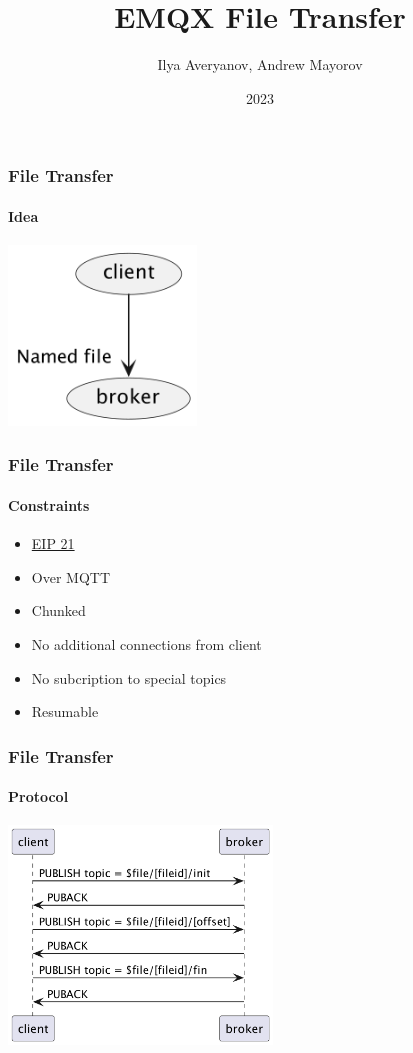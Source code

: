 \documentclass{beamer}
\title{EMQX File Transfer}
\author{Ilya Averyanov, Andrew Mayorov}
\institute{EMQX}
\date{2023}
\begin{document}
\frame{\titlepage}

\begin{frame}
    \frametitle{File Transfer}
    \framesubtitle{Idea}

    \begin{center}
        \includegraphics[width=5cm, keepaspectratio]{images/idea.png}
    \end{center}
\end{frame}

\begin{frame}
    \frametitle{File Transfer}
    \framesubtitle{Constraints}

    \begin{center}
        \begin{itemize}
            \item \href{https://github.com/emqx/eip/blob/main/active/0021-transfer-files-over-mqtt.md}{EIP 21}
            \item Over MQTT
            \item Chunked
            \item No additional connections from client
            \item No subcription to special topics
            \item Resumable
        \end{itemize}
    \end{center}
\end{frame}

\begin{frame}
    \frametitle{File Transfer}
    \framesubtitle{Protocol}

    \begin{center}
        \includegraphics[width=7cm, keepaspectratio]{images/proto.png}
    \end{center}
\end{frame}
\end{document}
